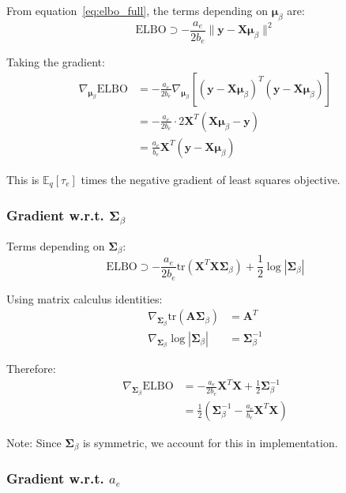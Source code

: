 \documentclass[11pt]{article}
\newcommand{\E}{\mathbb{E}}
\newcommand{\ELBO}{\text{ELBO}}
\newcommand{\tr}{\text{tr}}
\begin{document}
From equation~\eqref{eq:elbo_full}, the terms depending on $\bm{\mu}_\beta$ are:
\begin{equation}
\ELBO \supset -\frac{a_e}{2b_e} \|\bm{y} - \bm{X}\bm{\mu}_\beta\|^2
\end{equation}

Taking the gradient:
\begin{align}
\nabla_{\bm{\mu}_\beta} \ELBO &= -\frac{a_e}{2b_e} \nabla_{\bm{\mu}_\beta} [(\bm{y} - \bm{X}\bm{\mu}_\beta)^T(\bm{y} - \bm{X}\bm{\mu}_\beta)] \nonumber\\
&= -\frac{a_e}{2b_e} \cdot 2\bm{X}^T(\bm{X}\bm{\mu}_\beta - \bm{y}) \nonumber\\
&= \frac{a_e}{b_e} \bm{X}^T(\bm{y} - \bm{X}\bm{\mu}_\beta)
\label{eq:grad_mu}
\end{align}

This is $\E_q[\tau_e]$ times the negative gradient of least squares objective.

\subsubsection{Gradient w.r.t. \texorpdfstring{$\bm{\Sigma}_\beta$}{Sigma_beta}}

Terms depending on $\bm{\Sigma}_\beta$:
\begin{equation}
\ELBO \supset -\frac{a_e}{2b_e} \tr(\bm{X}^T\bm{X}\bm{\Sigma}_\beta) + \frac{1}{2}\log |\bm{\Sigma}_\beta|
\end{equation}

Using matrix calculus identities:
\begin{align}
\nabla_{\bm{\Sigma}_\beta} \tr(\bm{A}\bm{\Sigma}_\beta) &= \bm{A}^T\\
\nabla_{\bm{\Sigma}_\beta} \log |\bm{\Sigma}_\beta| &= \bm{\Sigma}_\beta^{-1}
\end{align}

Therefore:
\begin{align}
\nabla_{\bm{\Sigma}_\beta} \ELBO &= -\frac{a_e}{2b_e} \bm{X}^T\bm{X} + \frac{1}{2}\bm{\Sigma}_\beta^{-1} \nonumber\\
&= \frac{1}{2}\left(\bm{\Sigma}_\beta^{-1} - \frac{a_e}{b_e} \bm{X}^T\bm{X}\right)
\label{eq:grad_Sigma}
\end{align}

Note: Since $\bm{\Sigma}_\beta$ is symmetric, we account for this in implementation.

\subsubsection{Gradient w.r.t. \texorpdfstring{$a_e$}{a_e}}
\end{document}
